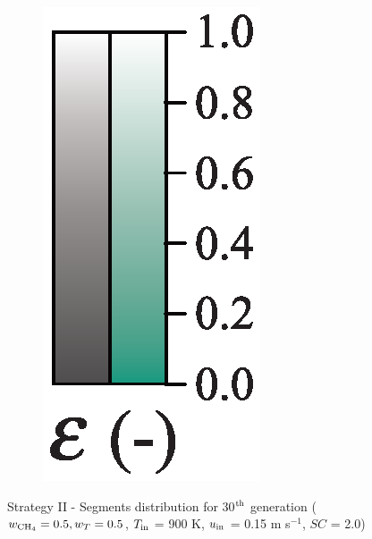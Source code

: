 \documentclass[preprint,12pt]{elsarticle}
\begin{document}
\begin{figure}[h!]
\begin{subfigure}[b]{0.1\textwidth}
     	\includegraphics[width=\textwidth]{segments_porosity.eps}
     \end{subfigure}
\caption{\label{fig:30L6040G1-TField} Strategy II - Segments distribution for 30$^{\rm{th}}$ generation ($w_{\rm{CH_4}} = 0.5, w_T = 0.5$, $T_{\rm{in}}$ = 900 K, $u_{\rm{in}}$ = 0.15 m s$^{-1}$, $SC$ = 2.0)}
\end{figure}
\end{document}
